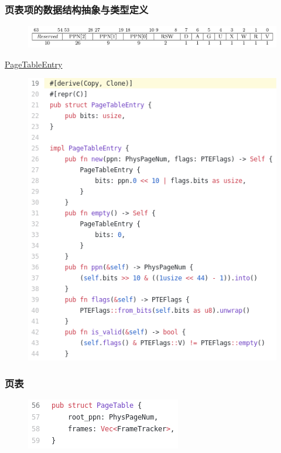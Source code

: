 \begin{frame}
    \frametitle{页表项的数据结构抽象与类型定义}
    \begin{figure}
        \centering
        \includegraphics[width=0.6\linewidth]{figs/sv39-pte.png}
    \end{figure}
% 
% 
% 
\href{https://github.com/rcore-os/rCore-Tutorial-v3/blob/ch4/os/src/mm/page_table.rs\#L21}{PageTableEntry}
% 
    \begin{figure}
        \centering
        \includegraphics[width=0.6\linewidth]{figs/page_table-45.png}
    \end{figure}
% 
% 
\end{frame}
\begin{frame}
    \frametitle{页表}
% 
% 
    \begin{figure}
        \centering
        \includegraphics[width=0.6\linewidth]{figs/page_table-56.png}
    \end{figure}
% 
% 
% 
% 
\end{frame}
